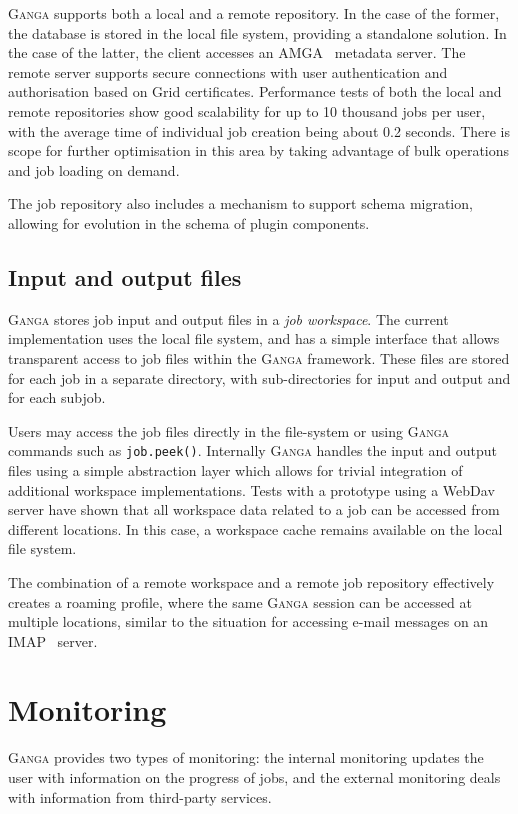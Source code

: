 \documentclass{elsart}
\def\ganga {\textsc{Ganga}\xspace}
\def\grid {Grid\xspace}
\begin{document}
\ganga supports both a local and a remote repository. In the
case of the former, the database is stored in the local file system,
providing a standalone solution. 
In the case of the latter,
the client accesses an AMGA~\cite{AMGA} metadata
server. The remote server supports secure connections with user
authentication and authorisation based on \grid certificates.
Performance tests of both the local and remote repositories show good
scalability for up to 10 thousand jobs per user, with the average time
of individual job creation being about 0.2 seconds. There is scope for
further optimisation in this area by taking advantage of bulk
operations and job loading on demand.

The job repository also includes a mechanism to support schema migration,
allowing for evolution in the schema of plugin components.

\subsection{Input and output files}

\ganga stores job input and output files in a \emph{job workspace}. 
The current implementation uses the local file system, and has a simple
interface that allows transparent access to job files within the
\ganga framework. These files are stored for each job in a separate
directory, with sub-directories for input and output and for each subjob.

Users may access the job files directly in the file-system or using \ganga commands
such as \texttt{job.peek()}. Internally \ganga handles the input and output
files using a simple abstraction layer which allows for trivial integration
of additional workspace implementations.
Tests with a prototype using a WebDav~\cite{WebDav}
server have shown that all workspace data related to a
job can be accessed from different locations. In this case, a workspace
cache remains available on the local file system.

The combination of a remote workspace and a remote job repository effectively
creates a roaming profile, where the same \ganga session can be accessed at
multiple locations, similar to the situation for accessing e-mail messages
on an IMAP~\cite{IMAP} server.

\section{Monitoring}
\label{sec:mon}
\ganga provides two types of monitoring: the internal monitoring updates
the user with information on the progress of jobs, and the external
monitoring deals with information from third-party services.
\end{document}
